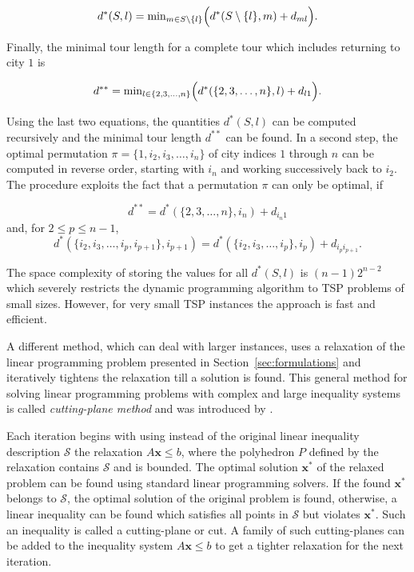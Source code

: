 \documentclass[10pt,a4paper,fleqn]{article}
\begin{document}
\begin{equation}
    d^*(S,l) = \mathrm{min}_{m \in S\setminus\{l\}}\Bigl( d^*(S\setminus\{l\},m) + d_{ml}\Bigl).
\end{equation}

Finally, the minimal tour length for a complete tour which includes returning
to city $1$ is

\begin{equation}
    d^{**} = \mathrm{min}_{l \in \{2,3,\dots,n\}}\Bigl( d^*(\{2,3,\dots,n\}, l)
    + d_{l1}\Bigl). 
\end{equation}

Using the last two equations, the quantities $d^*(S,l)$ can be computed
recursively and the minimal tour length $d^{**}$ can be found.  In a
second step, the optimal permutation $\pi = \{1, i_2, i_3,\dots,i_n\}$
of city indices $1$ through $n$ can be computed in reverse order,
starting with $i_n$ and working successively back to $i_2$. The
procedure exploits the fact that a permutation $\pi$ can only be
optimal, if

\begin{equation}
    d^{**} = d^*(\{2,3,\dots,n\}, i_n) + d_{i_n1}
\end{equation}
and, for $2 \le p \le n-1$,
\begin{equation}
    d^*(\{i_2, i_3,\dots, i_p, i_{p+1}\}, i_{p+1}) = 
    d^*(\{i_2,i_3,\dots,i_p\}, i_p) + d_{i_pi_{p+1}}.
\end{equation}

The space complexity of storing the values for all $d^*(S,l)$ is $(n-1)2^{n-2}$
which severely restricts the dynamic programming algorithm to TSP
problems of small sizes. However, for very small TSP instances the approach is
fast and efficient.

A different method, which can deal with larger instances, uses a relaxation of
the linear programming problem presented in Section~\ref{sec:formulations} and
iteratively tightens the relaxation till a solution is found. This general
method for solving linear programming problems with complex and large
inequality systems is called \emph{cutting-plane method} and was introduced by
\cite{Dantzig1954}. 

Each iteration begins with using instead of the original linear inequality
description $\mathcal{S}$ the relaxation $A\mathbf{x} \le b$, where the
polyhedron $P$ defined by the relaxation contains $\mathcal{S}$ and is bounded.
The optimal solution $\mathbf{x}^*$ of the relaxed problem can be found using
standard linear programming solvers. If the found $\mathbf{x}^*$ belongs to
$\mathcal{S}$, the optimal solution of the original problem is found,
otherwise, a linear inequality can be found which satisfies all points in
$\mathcal{S}$ but violates $\mathbf{x}^*$. Such an inequality is called a
cutting-plane or cut. A family of such cutting-planes can be added to
the inequality system  $A\mathbf{x} \le b$ to get a tighter relaxation for the
next iteration. 
\end{document}
